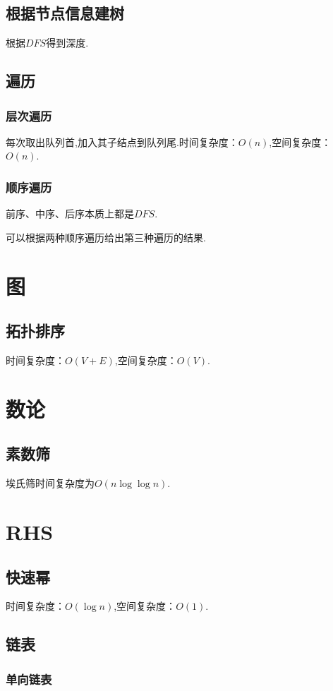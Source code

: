 \documentclass{code}
\newcommand{\fzd}[1]{\ensuremath{O\left(#1\right)}}
\newcommand{\code}[1]{}
\begin{document}
\subsection{根据节点信息建树}
根据$DFS$得到深度.
\code{BuildTreeByDFS}
\subsection{遍历}
\subsubsection{层次遍历}
每次取出队列首,加入其子结点到队列尾.时间复杂度：\fzd{n},空间复杂度：\fzd{n}.
\code{LevelOrderTraversal}
\subsubsection{顺序遍历}
前序、中序、后序本质上都是$DFS$.
\code{OrderTraversal}
可以根据两种顺序遍历给出第三种遍历的结果.
\code{OrderTraversalByTwoOrders}
\newpage
\section{图}
\subsection{拓扑排序}
时间复杂度：\fzd{V + E},空间复杂度：\fzd{V}.
\code{TopologicalSort}
\newpage
\section{数论}
\subsection{素数筛}
埃氏筛时间复杂度为\fzd{n \log \log n}.
\code{SieveOfEratosthenes}
\newpage
\section{RHS}
\subsection{快速幂}
时间复杂度：\fzd{\log n},空间复杂度：\fzd{1}.
\code{FastPower}
\subsection{链表}
\subsubsection{单向链表}
\code{SingleLinkedList}
\end{document}
